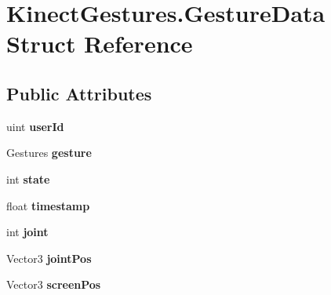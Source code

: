 \hypertarget{struct_kinect_gestures_1_1_gesture_data}{}\section{Kinect\+Gestures.\+Gesture\+Data Struct Reference}
\label{struct_kinect_gestures_1_1_gesture_data}
\subsection*{Public Attributes}
\begin{DoxyCompactItemize}
\item 
\mbox{\label{struct_kinect_gestures_1_1_gesture_data_a2eecc1fbd066859e74b0423a01a30afe}} 
uint {\bfseries user\+Id}
\item 
\mbox{\label{struct_kinect_gestures_1_1_gesture_data_af5c52072f1be6066a9cb5aba4ea46049}} 
Gestures {\bfseries gesture}
\item 
\mbox{\label{struct_kinect_gestures_1_1_gesture_data_a7f27c5e9bb6d3cd1252d2673f7688b11}} 
int {\bfseries state}
\item 
\mbox{\label{struct_kinect_gestures_1_1_gesture_data_aa00c7d789685454b062644ff2e0faab1}} 
float {\bfseries timestamp}
\item 
\mbox{\label{struct_kinect_gestures_1_1_gesture_data_a89196077f253100f4daf4e7011329718}} 
int {\bfseries joint}
\item 
\mbox{\label{struct_kinect_gestures_1_1_gesture_data_a3ff3d29a5674237299883187d060d803}} 
Vector3 {\bfseries joint\+Pos}
\item 
\mbox{\label{struct_kinect_gestures_1_1_gesture_data_a4517d45cbb891529a2c92d66df20bdd7}} 
Vector3 {\bfseries screen\+Pos}
\item 
\mbox{\label{struct_kinect_gestures_1_1_gesture_data_a260eaec139e766705ede39c859d0e85a}} 

\end{DoxyCompactItemize}
